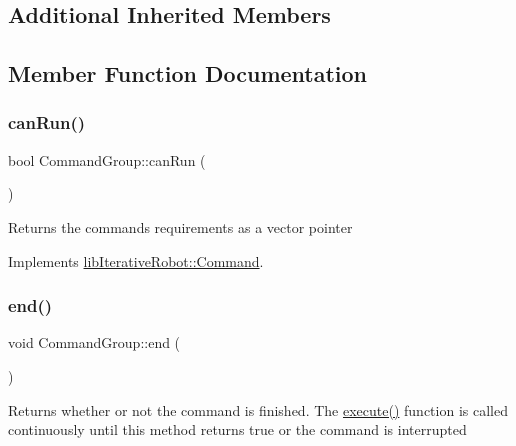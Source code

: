 \subsection*{Additional Inherited Members}


\subsection{Member Function Documentation}
\mbox{\label{classlib_iterative_robot_1_1_command_group_abd75c9b52e6b4ae5af1b6724e865311f}} 
\subsubsection{\texorpdfstring{canRun()}{canRun()}}
{\footnotesize\ttfamily bool Command\+Group\+::can\+Run (\begin{DoxyParamCaption}{ }\end{DoxyParamCaption})\hspace{0.3cm}{\ttfamily [virtual]}}

Returns the command\textquotesingle{}s requirements as a vector pointer 

Implements \mbox{\hyperlink{classlib_iterative_robot_1_1_command_aebef0fdf029a15ee48fbb778c4265609}{lib\+Iterative\+Robot\+::\+Command}}.

\mbox{\label{classlib_iterative_robot_1_1_command_group_a28ad3a1c2f6b4f9aea10efa1a824895e}} 
\subsubsection{\texorpdfstring{end()}{end()}}
{\footnotesize\ttfamily void Command\+Group\+::end (\begin{DoxyParamCaption}{ }\end{DoxyParamCaption})\hspace{0.3cm}{\ttfamily [virtual]}}

Returns whether or not the command is finished. The \mbox{\hyperlink{classlib_iterative_robot_1_1_command_group_a5e91d370cafde43548d79945ccb4d8fe}{execute()}} function is called continuously until this method returns true or the command is interrupted 

